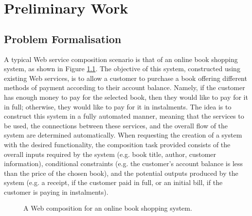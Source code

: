\chapter{Preliminary Work}\label{C:preliminary}

\section{Problem Formalisation}
A typical Web service composition scenario is that of an online book shopping system, as shown in Figure \ref{fig:compositionExample}. The objective of this system, constructed using existing Web services, is to allow a customer to purchase a book offering different methods of payment according to their account balance. Namely, if the customer has enough money to pay for the selected book, then they would like to pay for it in full; otherwise, they would like to pay for it in instalments. The idea is to construct this system in a fully automated manner, meaning that the services to be used, the connections between these services, and the overall flow of the system are determined automatically. When requesting the creation of a system with the desired functionality, the composition task provided consists of the overall inputs required by the system (e.g. book title, author, customer information), conditional constraints (e.g. the customer's account balance is less than the price of the chosen book), and the potential outputs produced by the system (e.g. a receipt, if the customer paid in full, or an initial bill, if the customer is paying in instalments).

\begin{figure}
\centerline{
}
\caption{A Web composition for an online book shopping system.}
\label{fig:compositionExample}
\end{figure}

